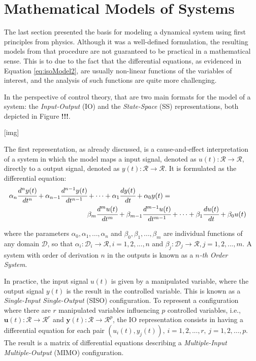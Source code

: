 \documentclass[a4paper,11pt]{book}
\numberwithin{figure}{chapter}
\numberwithin{equation}{chapter}
\numberwithin{table}{chapter}
\theoremstyle{definition}
\begin{document}
\section{Mathematical Models of Systems}

The last section presented the basis for modeling a dynamical system using first principles from physics. Although it was a well-defined formulation, the resulting models from that procedure are not guaranteed to be practical in a mathematical sense. This is to due to the fact that the differential equations, as evidenced in Equation \eqref{eq:isoModel2}, are usually non-linear functions of the variables of interest, and the analysis of such functions are quite more challenging. 

In the perspective of control theory, that are two main formats for the model of a system: the \textit{Input-Output} (IO) and the \textit{State-Space} (SS) representations, both depicted in Figure \textbf{!!!}. 

[img]

The first representation, as already discussed, is a cause-and-effect interpretation of a system in which the model maps a input signal, denoted as $u(t) : \mathcal{R} \rightarrow \mathcal{R}$, directly to a output signal, denoted as $y(t) : \mathcal{R} \rightarrow \mathcal{R}$. It is formulated as the differential equation:
\begin{equation} \label{eq:IORepr01}
\begin{split}
    \alpha_n \cfrac{d^n y(t)}{dt^n} + \alpha_{n-1} \cfrac{d^{n-1} y(t)}{dt^{n-1}} &+ \cdots + \alpha_{1} \cfrac{d y(t)}{dt} + \alpha_{0} y(t) = \\
    & \beta_m \cfrac{d^m u(t)}{dt^m} + \beta_{m-1} \cfrac{d^{m-1} u(t)}{dt^{m-1}} + \cdots + \beta_{1} \cfrac{d u(t)}{dt} + \beta_{0} u(t)
\end{split}
\end{equation}

\noindent where the parameters $\alpha_0, \alpha_1, ..., \alpha_n$ and $\beta_0, \beta_1, ..., \beta_m$ are individual functions of any domain $\mathcal{D}$, so that $\alpha_i : \mathcal{D}_i \rightarrow \mathcal{R}, i = 1,2,...,n$ and $\beta_j : \mathcal{D}_j \rightarrow \mathcal{R}, j = 1,2,...,m$. A system with order of derivation $n$ in the outputs is known as a \textit{$n$-th Order System}.

In practice, the input signal $u(t)$ is given by a manipulated variable, where the output signal $y(t)$ is the result in the controlled variable. This is known as a \textit{Single-Input Single-Output} (SISO) configuration. To represent a configuration where there are $r$ manipulated variables influencing $p$ controlled variables, i.e., $\mathbf{u}(t) : \mathcal{R} \rightarrow \mathcal{R}^r$ and $\mathbf{y}(t) : \mathcal{R} \rightarrow \mathcal{R}^p$, the IO representation consists in having a differential equation for each pair $(u_i(t), y_j(t)),\ i = 1,2,...,r,\ j = 1,2,...,p$. The result is a matrix of differential equations describing a \textit{Multiple-Input Multiple-Output} (MIMO) configuration.
\end{document}
